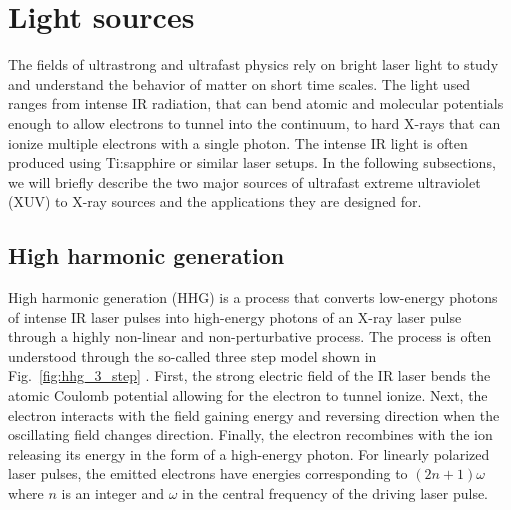 \section{Light sources}

The fields of ultrastrong and ultrafast physics rely on bright laser light to study and understand the behavior of matter on short time scales. The light used ranges from intense IR radiation, that can bend atomic and molecular potentials enough to allow electrons to tunnel into the continuum, to hard X-rays that can ionize multiple electrons with a single photon. The intense IR light is often produced  using Ti:sapphire or similar laser setups. In the following subsections, we will briefly describe the two major sources of ultrafast extreme ultraviolet (XUV) to X-ray sources and the applications they are designed for.

\subsection{High harmonic generation} %
\label{sub:high_harmonic_generation}
High harmonic generation (HHG) is a process that converts low-energy photons of intense IR laser pulses into high-energy photons of an X-ray laser pulse through a highly non-linear and non-perturbative process. The process is often understood through the so-called three step model shown in Fig.~\ref{fig:hhg_3_step} \cite{lewenstein1994,corkum1994,popmintchev2010}. First, the strong electric field of the IR laser bends the atomic Coulomb potential allowing for the electron to tunnel ionize. Next, the electron interacts with the field gaining energy and reversing direction when the oscillating field changes direction. Finally, the electron recombines with the ion releasing its energy in the form of a high-energy photon. For linearly polarized laser pulses, the emitted electrons have energies corresponding to $(2n+1)\omega$ where $n$ is an integer and $\omega$ in the central frequency of the driving laser pulse. 

